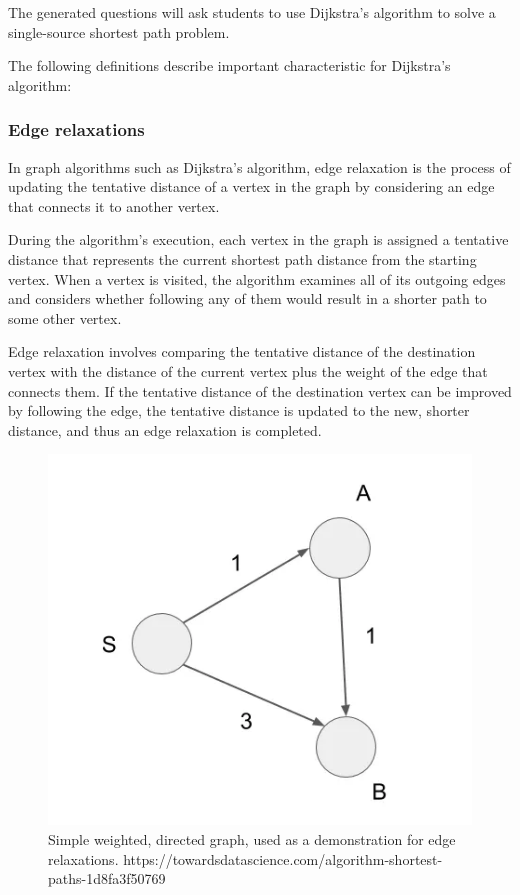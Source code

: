 \documentclass{l4proj}
\begin{document}
The generated questions will ask students to use Dijkstra's algorithm to solve a single-source shortest path problem.

The following definitions describe important characteristic for Dijkstra's algorithm:
\subsubsection{Edge relaxations}

In graph algorithms such as Dijkstra's algorithm, edge relaxation is the process of updating the tentative distance of a vertex in the graph by considering an edge that connects it to another vertex.

During the algorithm's execution, each vertex in the graph is assigned a tentative distance that represents the current shortest path distance from the starting vertex. When a vertex is visited, the algorithm examines all of its outgoing edges and considers whether following any of them would result in a shorter path to some other vertex.

Edge relaxation involves comparing the tentative distance of the destination vertex with the distance of the current vertex plus the weight of the edge that connects them. If the tentative distance of the destination vertex can be improved by following the edge, the tentative distance is updated to the new, shorter distance, and thus an edge relaxation is completed. 

\begin{figure}[!h]
    \centering
    \includegraphics[width=0.6\linewidth]{images/edge_relaxation.png}    

    \caption{Simple weighted, directed graph, used as a demonstration for edge relaxations. https://towardsdatascience.com/algorithm-shortest-paths-1d8fa3f50769}
    \label{fig:edge_r} 
\end{figure}
\end{document}
